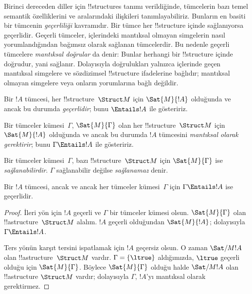 


\begin{explain}
Birinci dereceden diller için !!{structure}s tanımı verildiğinde,
tümcelerin bazı temel semantik özelliklerini ve aralarındaki ilişkileri
tanımlayabiliriz. Bunların en basiti bir tümcenin \emph{geçerliliği}
kavramıdır. Bir tümce her !!{structure} içinde sağlanıyorsa geçerlidir.
Geçerli tümceler, içlerindeki mantıksal olmayan simgelerin nasıl
yorumlandığından bağımsız olarak sağlanan tümcelerdir. Bu nedenle
geçerli tümcelere \emph{mantıksal doğrular} da denir: Bunlar herhangi
bir !!{structure} içinde doğrudur, yani sağlanır. Dolayısıyla
doğrulukları yalnızca içlerinde geçen mantıksal simgelere ve
sözdizimsel !!{structure} ifadelerine bağlıdır; mantıksal olmayan
simgelere veya onların yorumlarına bağlı değildir.
\end{explain}

\begin{defn}[Geçerlilik]
Bir $!A$ tümcesi, her !!{structure}~$\Struct M$ için $\Sat{M}{!A}$
olduğunda ve ancak bu durumda \emph{geçerlidir}; bunu $\Entails !A$
ile gösteririz.
\end{defn}

\begin{defn}
Bir tümceler kümesi~$\Gamma$, $\Sat{M}{\Gamma}$ olan her
!!{structure}~$\Struct M$ için $\Sat{M}{!A}$ olduğunda ve ancak bu
durumda $!A$ tümcesini \emph{mantıksal olarak gerektirir}; bunu
$\Gamma\Entails !A$ ile gösteririz.
\end{defn}

\begin{defn}[Sağlanabilirlik]
Bir tümceler kümesi~$\Gamma$, bazı !!{structure}~$\Struct M$ için
$\Sat{M}{\Gamma}$ ise \emph{sağlanabilirdir}. $\Gamma$ sağlanabilir
değilse \emph{sağlanamaz} denir.
\end{defn}

\begin{prop}
Bir $!A$ tümcesi, ancak ve ancak her tümceler kümesi~$\Gamma$ için
$\Gamma\Entails !A$ ise geçerlidir.
\end{prop}

\begin{proof}
İleri yön için $!A$ geçerli ve $\Gamma$ bir tümceler kümesi olsun.
$\Sat{M}{\Gamma}$ olan !!a{structure}~$\Struct M$ alalım. $!A$ geçerli
olduğundan $\Sat{M}{!A}$; dolayısıyla $\Gamma\Entails !A$.

Ters yönün karşıt tersini ispatlamak için $!A$ geçersiz olsun. O zaman
$\Sat/{M}{!A}$ olan !!a{structure}~$\Struct M$ vardır. $\Gamma=\{\ltrue\}$
aldığımızda, $\ltrue$ geçerli olduğu için $\Sat{M}{\Gamma}$. Böylece
$\Sat{M}{\Gamma}$ olduğu halde $\Sat/{M}{!A}$ olan !!a{structure}
$\Struct M$ vardır; dolayısıyla $\Gamma$, $!A$'yı mantıksal olarak
gerektirmez.
\end{proof}

